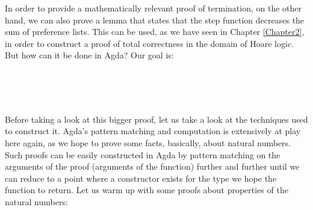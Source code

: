 {In order to provide a mathematically relevant proof of termination, on the other hand, we can also prove a lemma that states that the step function decreases the sum of preference lists. This can be used, as we have seen in Chapter \ref{Chapter2}, in order to construct a proof of total correctness in the domain of Hoare logic. But how can it be done in Agda? Our goal is:

\begin{code}%
\>[0]\AgdaSpace{}%
\AgdaSymbol{:}%
\>[970I]\AgdaSymbol{(}\AgdaSpace{}%
\AgdaSymbol{:}\AgdaSpace{}%
\AgdaSymbol{)}\AgdaSpace{}%
\<%
\\
\>[.][@{}l@{}]\<[970I]%
\>[10]\AgdaSpace{}%
\AgdaSymbol{(}\AgdaSpace{}%
\AgdaSymbol{)}\AgdaSpace{}%
\AgdaSymbol{(}\AgdaSpace{}%
\AgdaSymbol{)}\<%
\\
%
\>[10]\<%
\\
%
\>[10]\AgdaSpace{}%
\AgdaSymbol{(}\AgdaSpace{}%
\AgdaSymbol{(}\AgdaSpace{}%
\AgdaSymbol{))}\AgdaSpace{}%
\AgdaSymbol{(}\AgdaSpace{}%
\AgdaSymbol{(}\AgdaSpace{}%
\AgdaSymbol{))}\<%
\end{code}

Before taking a look at this bigger proof, let us take a look at the techniques used to construct it. Agda's pattern matching and computation is extensively at play here again, as we hope to prove some facts, basically, about natural numbers. Such proofs can be easily constructed in Agda by pattern matching on the arguments of the proof (arguments of the function) further and further until we can reduce to a point where a constructor exists for the type we hope the function to return. Let us warm up with some proofs about properties of the natural numbers:

}
